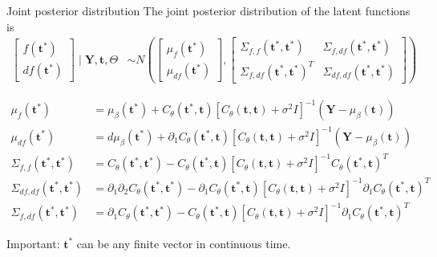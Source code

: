 \documentclass[ignorenonframetext,xcolor=pdflatex,table,dvipsnames,serif]{beamer}
\begin{document}
\begin{frame}{Joint posterior distribution}
The joint posterior distribution of the latent functions is
\begin{align*}
\begin{bmatrix}f(\mathbf{t}^\ast)\\ df(\mathbf{t}^\ast) \end{bmatrix} \mid \mathbf{Y}, \mathbf{t}, \Theta &\sim
N\left(\begin{bmatrix}\mu_f(\mathbf{t}^\ast)\\ \mu_{df}(\mathbf{t}^\ast)\end{bmatrix}, \begin{bmatrix}\Sigma_{f,f}(\mathbf{t}^\ast, \mathbf{t}^\ast) & \Sigma_{f,df}(\mathbf{t}^\ast, \mathbf{t}^\ast)\\ \Sigma_{f,df}(\mathbf{t}^\ast, \mathbf{t}^\ast)^T & \Sigma_{df,df}(\mathbf{t}^\ast, \mathbf{t}^\ast)\end{bmatrix}\right)
\end{align*}

{\footnotesize
\begin{align*}
  \mu_f(\mathbf{t}^\ast) &= \mu_{\beta}(\mathbf{t}^\ast) + C_\theta(\mathbf{t}^\ast, \mathbf{t})\left[C_\theta(\mathbf{t}, \mathbf{t}) + \sigma^2 I\right]^{-1}\left(\mathbf{Y} - \mu_\beta(\mathbf{t})\right)\nonumber\\
  \mu_{df}(\mathbf{t}^\ast) &= d\mu_{\beta}(\mathbf{t}^\ast) + \partial_1 C_\theta(\mathbf{t}^\ast, \mathbf{t})\left[C_\theta(\mathbf{t}, \mathbf{t}) + \sigma^2 I\right]^{-1}\left(\mathbf{Y} - \mu_\beta(\mathbf{t})\right)\nonumber\\
  \Sigma_{f,f}(\mathbf{t}^\ast, \mathbf{t}^\ast) &= C_\theta(\mathbf{t}^\ast, \mathbf{t}^\ast) - C_\theta(\mathbf{t}^\ast, \mathbf{t})\left[C_\theta(\mathbf{t}, \mathbf{t}) + \sigma^2 I\right]^{-1} C_\theta(\mathbf{t}^\ast, \mathbf{t})^T\nonumber\\
  \Sigma_{df,df}(\mathbf{t}^\ast, \mathbf{t}^\ast) &= \partial_1 \partial_2 C_\theta(\mathbf{t}^\ast, \mathbf{t}^\ast) - \partial_1 C_\theta(\mathbf{t}^\ast, \mathbf{t})\left[C_\theta(\mathbf{t}, \mathbf{t}) + \sigma^2 I\right]^{-1} \partial_1 C_\theta(\mathbf{t}^\ast, \mathbf{t})^T\nonumber\\
  \Sigma_{f,df}(\mathbf{t}^\ast, \mathbf{t}^\ast) &= \partial_1 C_\theta(\mathbf{t}^\ast, \mathbf{t}^\ast) - C_\theta(\mathbf{t}^\ast, \mathbf{t})\left[C_\theta(\mathbf{t}, \mathbf{t}) + \sigma^2 I\right]^{-1}\partial_1 C_\theta(\mathbf{t}^\ast, \mathbf{t})^T\nonumber
\end{align*}
}%

Important: $\mathbf{t}^\ast$ can be any finite vector in continuous time.
\end{frame}
\end{document}

